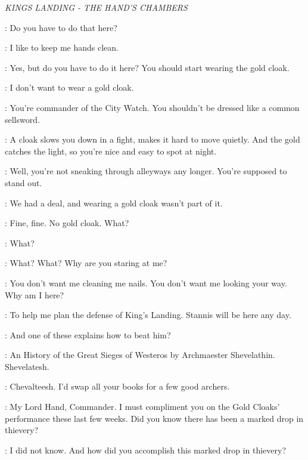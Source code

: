 \scene

\textit{KINGS LANDING - THE HAND'S CHAMBERS} 


\TYRION: Do you have to do that here? 

\BRONN: I like to keep me hands clean. 

\TYRION: Yes, but do you have to do it here? You should start wearing the gold cloak. 

\BRONN: I don't want to wear a gold cloak. 

\TYRION: You're commander of the City Watch. You shouldn't be dressed like a common sellsword. 

\BRONN: A cloak slows you down in a fight, makes it hard to move quietly. And the gold catches the light, so you're nice and easy to spot at night. 

\TYRION: Well, you're not sneaking through alleyways any longer. You're supposed to stand out. 

\BRONN: We had a deal, and wearing a gold cloak wasn't part of it.


\TYRION: Fine, fine. No gold cloak. What? 

\BRONN: What? 

\TYRION: What? What? Why are you staring at me? 

\BRONN: You don't want me cleaning me nails. You don't want me looking your way. Why am I here? 

\TYRION: To help me plan the defense of King's Landing. Stannis will be here any day. 

\BRONN: And one of these  explains how to beat him? 

\TYRION: An History of the Great Sieges of Westeros by Archmaester Shevelathin. Shevelatesh. 

\BRONN: Chevalteesh. I'd swap all your books for a few good archers.


\VARYS: My Lord Hand, Commander. I must compliment you on the Gold Cloaks' performance these last few weeks. Did you know there has been a marked drop in thievery? 

\TYRION: I did not know. And how did you accomplish this marked drop in thievery? 

